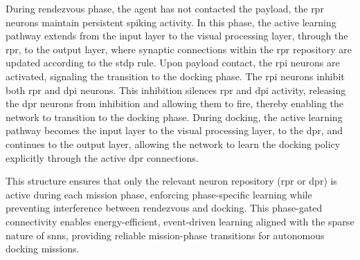 During rendezvous phase, the agent has not contacted the payload, the \ac{rpr} neurons maintain persistent spiking activity. In this phase, the active learning pathway extends from the input layer to the visual processing layer, through the \ac{rpr}, to the output layer, where synaptic connections within the \ac{rpr} repository are updated according to the \ac{stdp} rule. Upon payload contact, the \ac{rpi} neurons are activated, signaling the transition to the docking phase. The \ac{rpi} neurons inhibit both \ac{rpr} and \ac{dpi} neurons. This inhibition silences \ac{rpr} and \ac{dpi} activity, releasing the \ac{dpr} neurons from inhibition and allowing them to fire, thereby enabling the network to transition to the docking phase. During docking, the active learning pathway becomes the input layer to the visual processing layer, to the \ac{dpr}, and continues to the output layer, allowing the network to learn the docking policy explicitly through the active \ac{dpr} connections.

This structure ensures that only the relevant neuron repository (\ac{rpr} or \ac{dpr}) is active during each mission phase, enforcing phase-specific learning while preventing interference between rendezvous and docking. This phase-gated connectivity enables energy-efficient, event-driven learning aligned with the sparse nature of \ac{snn}s, providing reliable mission-phase transitions for autonomous docking missions.




